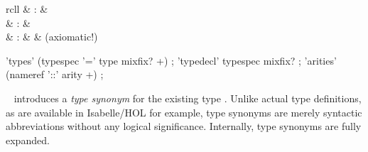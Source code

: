 \begin{isabellebody}
\begin{isamarkuptext}
\begin{description}
  \end{description}%
\end{isamarkuptext}%
\isamarkuptrue%
%
\isamarkuptrue%
%
\begin{isamarkuptext}%
\begin{matharray}{rcll}
    \hypertarget{command.types}{\hyperlink{command.types}{\mbox{}}} & : &  \\
    \hypertarget{command.typedecl}{\hyperlink{command.typedecl}{\mbox{}}} & : &  \\
    \hypertarget{command.arities}{\hyperlink{command.arities}{\mbox{}}} & : &  & (axiomatic!) \\
  \end{matharray}

  \begin{rail}
    'types' (typespec '=' type mixfix? +)
    ;
    'typedecl' typespec mixfix?
    ;
    'arities' (nameref '::' arity +)
    ;
  \end{rail}

  \begin{description}

  \item \hyperlink{command.types}{\mbox{}}~ introduces a
  \emph{type synonym}  for the existing type
  \isa{{\isachardoublequote}{\isasymtau}{\isachardoublequote}}.  Unlike actual type definitions, as are available in
  Isabelle/HOL for example, type synonyms are merely syntactic
  abbreviations without any logical significance.  Internally, type
  synonyms are fully expanded.
  

\end{description}
\end{isamarkuptext}
\end{isabellebody}
